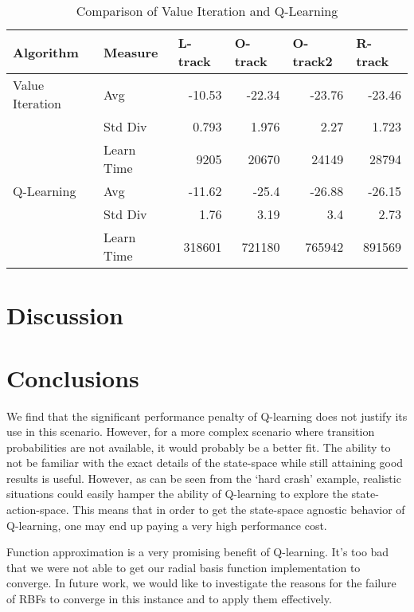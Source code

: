 \documentclass[12pt, letterpaper]{article}
\begin{document}
\begin{table}[htbp]
\caption{Comparison of Value Iteration and Q-Learning}
\begin{center}
\begin{tabular}{|l|l|r|r|r|r|}
\hline
\textbf{Algorithm} & \textbf{Measure} & \multicolumn{1}{l|}{\textbf{L-track}} & \multicolumn{1}{l|}{\textbf{O-track}} & \multicolumn{1}{l|}{\textbf{O-track2}} & \multicolumn{1}{l|}{\textbf{R-track}} \\ \hline
Value Iteration & Avg & -10.53 & -22.34 & -23.76 & -23.46 \\ \hline
 & Std Div & 0.793 & 1.976 & 2.27 & 1.723 \\ \hline
 & Learn Time & 9205 & 20670 & 24149 & 28794 \\ \hline
Q-Learning & Avg & -11.62 & -25.4 & -26.88 & -26.15 \\ \hline
 & Std Div & 1.76 & 3.19 & 3.4 & 2.73 \\ \hline
 & Learn Time & 318601 & 721180 & 765942 & 891569 \\ \hline
\end{tabular}
\end{center}
\label{comp}
\end{table}

\section{Discussion}

\section{Conclusions}
We find that the significant performance penalty of Q-learning does not justify its use in this scenario. However, for a more complex scenario where transition probabilities are not available, it would probably be a better fit. The ability to not be familiar with the exact details of the state-space while still attaining good results is useful. However, as can be seen from the `hard crash' example, realistic situations could easily hamper the ability of Q-learning to explore the state-action-space. This means that in order to get the state-space agnostic behavior of Q-learning, one may end up paying a very high performance cost.

Function approximation is a very promising benefit of Q-learning. It's too bad that we were not able to get our radial basis function implementation to converge. In future work, we would like to investigate the reasons for the failure of RBFs to converge in this instance and to apply them effectively.






\end{document}
